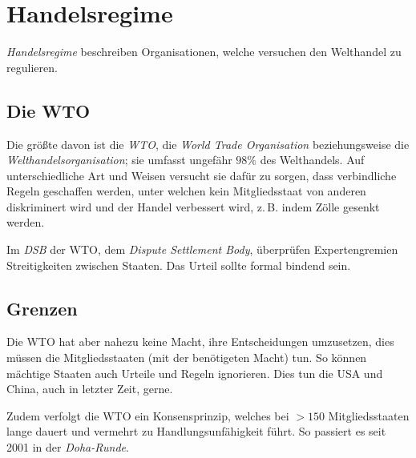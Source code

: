 \documentclass{article}
\begin{document}
\section{Handelsregime}
\emph{Handelsregime} beschreiben Organisationen, welche versuchen den Welthandel zu regulieren.
 
\subsection{Die WTO} 
Die größte davon ist die \emph{WTO}, die \emph{World Trade Organisation} beziehungsweise die \emph{Welthandelsorganisation}; sie umfasst ungefähr $98\%$ des Welthandels. Auf unterschiedliche Art und Weisen versucht sie dafür zu sorgen, dass verbindliche Regeln geschaffen werden, unter welchen kein Mitgliedsstaat von anderen diskriminert wird und der Handel verbessert wird, z.\,B. indem Zölle gesenkt werden.
 
Im \emph{DSB} der WTO, dem \emph{Dispute Settlement Body}, überprüfen Expertengremien Streitigkeiten zwischen Staaten. Das Urteil sollte formal bindend sein.
 
\subsection{Grenzen} 
Die WTO hat aber nahezu keine Macht, ihre Entscheidungen umzusetzen, dies müssen die Mitgliedsstaaten (mit der benötigeten Macht) tun. So können mächtige Staaten auch Urteile und Regeln ignorieren. Dies tun die USA und China, auch in letzter Zeit, gerne.
 
Zudem verfolgt die WTO ein Konsensprinzip, welches bei $> 150$ Mitgliedsstaaten lange dauert und vermehrt zu Handlungsunfähigkeit führt. So passiert es seit 2001 in der \emph{Doha-Runde}.
\end{document}
